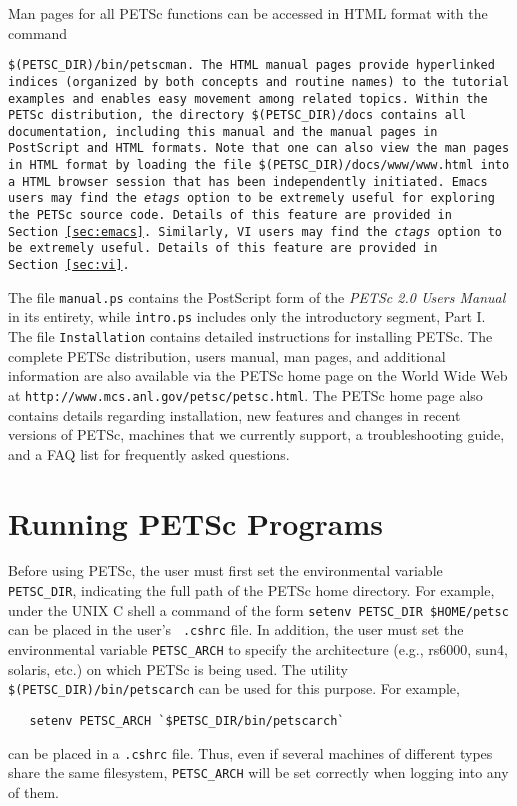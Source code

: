 Man pages for all PETSc functions can be
accessed in HTML format with the command {\tt \$(PETSC\_DIR)\-/bin\-/petscman.
The HTML manual pages
provide hyperlinked indices (organized by
both concepts and routine names) to the tutorial examples and enables
easy movement among related topics.  Within the PETSc distribution, the directory
{\tt \$(PETSC\_DIR)/docs} contains all documentation, including this
manual and the manual pages in PostScript and HTML
formats. Note that one can also view the man pages in HTML format
by loading the file {\tt \$(PETSC\_DIR)/docs/www/www.html}
into a HTML browser session that has been independently initiated.
Emacs users may find the
{\em etags} option to be extremely useful for exploring the PETSc
source code.  Details of this feature are provided in
Section~\ref{sec:emacs}. Similarly, VI users may find the
{\em ctags} option to be extremely useful. Details of this 
feature are provided in Section~\ref{sec:vi}.

The file {\tt manual.ps} contains the PostScript form of
the {\em PETSc 2.0 Users Manual} in its entirety, while {\tt intro.ps} 
includes only the introductory segment, Part I.   
The file {\tt Installation} contains detailed instructions for
installing PETSc. The complete PETSc distribution, users
manual, man pages, and additional information are also available via
the PETSc home page on the World Wide Web at
{\tt http://www.mcs.anl.gov/petsc/petsc.html}.  The PETSc home page also
contains details regarding installation, new features and changes in recent
versions of PETSc, machines that we currently support, a
troubleshooting guide, and a FAQ list for frequently asked questions.

\section{Running PETSc Programs}
\label{sec:running}

Before using PETSc, the user must first set the environmental variable
{\tt PETSC\_DIR},  indicating the full path of the PETSc home
directory.  For example, under the UNIX C shell a command of the form
{\tt setenv PETSC\_DIR \$HOME/petsc} can be placed in the user's {\tt
.cshrc} file.  In addition, the user must set the environmental
variable {\tt PETSC\_ARCH} to specify the architecture (e.g., rs6000,
sun4, solaris, etc.)  on which PETSc is being used.  The utility {\tt
\$(PETSC\_DIR)/bin/petscarch} can be used for this purpose.  For example,
\begin{verbatim}
   setenv PETSC_ARCH `$PETSC_DIR/bin/petscarch`
\end{verbatim}
can be placed in a {\tt .cshrc} file.  Thus, even if several machines of different
types share the same filesystem, {\tt PETSC\_ARCH} will be set correctly
when logging into any of them. 

}
